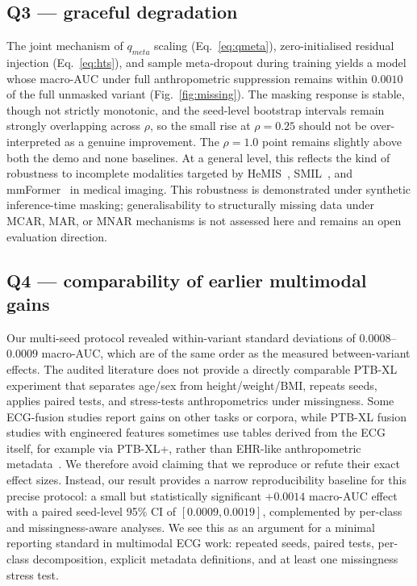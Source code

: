 \documentclass[mathematics,article,submit,pdftex]{Definitions/mdpi}
\def\texttt#1{#1}%
\def\mathrm#1{#1}%
\begin{document}
\subsection{Q3 --- graceful degradation}
The joint mechanism of $q_{\mathrm{meta}}$ scaling (Eq.~\eqref{eq:qmeta}), zero-initialised residual injection (Eq.~\eqref{eq:hts}), and sample meta-dropout during training yields a model whose macro-AUC under full anthropometric suppression remains within $0.0010$ of the full unmasked variant (Fig.~\ref{fig:missing}). The masking response is stable, though not strictly monotonic, and the seed-level bootstrap intervals remain strongly overlapping across $\rho$, so the small rise at $\rho{=}0.25$ should not be over-interpreted as a genuine improvement. The $\rho{=}1.0$ point remains slightly above both the \texttt{demo} and \texttt{none} baselines. At a general level, this reflects the kind of robustness to incomplete modalities targeted by HeMIS~\cite{Havaei2016}, SMIL~\cite{Ma2021}, and mmFormer~\cite{Zhang2022} in medical imaging. This robustness is demonstrated under synthetic inference-time masking; generalisability to structurally missing data under MCAR, MAR, or MNAR mechanisms is not assessed here and remains an open evaluation direction.

\subsection{Q4 --- comparability of earlier multimodal gains}
Our multi-seed protocol revealed within-variant standard deviations of $0.0008$--$0.0009$ macro-AUC, which are of the same order as the measured between-variant effects. The audited literature does not provide a directly comparable PTB-XL experiment that separates age/sex from height/weight/BMI, repeats seeds, applies paired tests, and stress-tests anthropometrics under missingness. Some ECG-fusion studies report gains on other tasks or corpora, while PTB-XL fusion studies with engineered features sometimes use tables derived from the ECG itself, for example via PTB-XL+, rather than EHR-like anthropometric metadata~\cite{Strodthoff2023PTBXLPlus,Holloway2026}. We therefore avoid claiming that we reproduce or refute their exact effect sizes. Instead, our result provides a narrow reproducibility baseline for this precise protocol: a small but statistically significant $+0.0014$ macro-AUC effect with a paired seed-level 95\% CI of $[0.0009, 0.0019]$, complemented by per-class and missingness-aware analyses. We see this as an argument for a minimal reporting standard in multimodal ECG work: repeated seeds, paired tests, per-class decomposition, explicit metadata definitions, and at least one missingness stress test.
\end{document}
